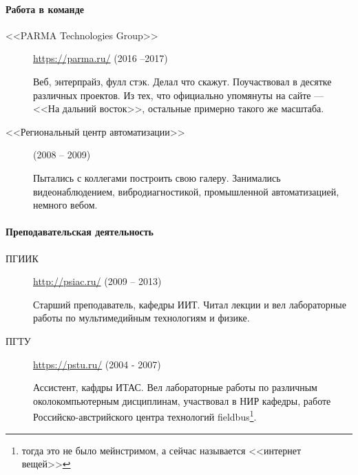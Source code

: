 \documentclass [a4paper,10pt]{article}
\begin{document}
\paragraph{Работа в команде}
\begin{description}
\item[<<PARMA Technologies Group>>] \url{https://parma.ru/} (2016 --2017)
	
Веб, энтерпрайз, фулл стэк. Делал что скажут. Поучаствовал в десятке различных проектов. 
Из тех, что официально упомянуты на сайте --- <<На дальний восток>>, остальные примерно такого же масштаба.

\item[<<Региональный центр автоматизации>>] (2008 -- 2009)

Пытались с коллегами построить свою галеру. Занимались видеонаблюдением, вибродиагностикой, промышленной автоматизацией, немного вебом.
\end{description}

\paragraph{Преподавательская деятельность}
\begin{description}
\item[ПГИИК] \url{http://psiac.ru/} (2009 -- 2013)

Старший преподаватель, кафедры ИИТ. Читал лекции и вел лабораторные работы по мультимедийным технологиям и физике.

\item[ПГТУ] \url{https://pstu.ru/} (2004 - 2007)

Ассистент, кафдры ИТАС. Вел лабораторные работы по различным околокомпьютерным дисциплинам, 
участвовал в НИР кафедры, работе Российско-австрийского центра технологий fieldbus\footnote{тогда это не было мейнстримом, а сейчас называется <<интернет вещей>>}.
\end{description}
\end{document}
